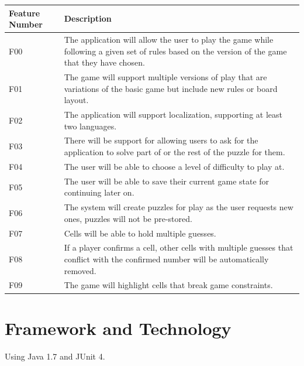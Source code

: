\documentclass{article}
\begin{document}
\begin{tabular}{ | p{1.5in} | p{4.5in} | }
\hline
\textbf{Feature Number} & \textbf{Description}\\
\hline
\hline
F00 & The application will allow the user to play the game while following a given set of rules based on the version of the game that they have chosen.\\
\hline
F01 & The game will support multiple versions of play that are variations of the basic game but include new rules or board layout.\\
\hline
F02 & The application will support localization, supporting at least two languages.\\
\hline
F03 & There will be support for allowing users to ask for the application to solve part of or the rest of the puzzle for them.\\
\hline
F04 & The user will be able to choose a level of difficulty to play at.\\
\hline
F05 & The user will be able to save their current game state for continuing later on.\\
\hline
F06 & The system will create puzzles for play as the user requests new ones, puzzles will not be pre-stored.\\
\hline
F07 & Cells will be able to hold multiple guesses.\\
\hline
F08 & If a player confirms a cell, other cells with multiple guesses that conflict with the confirmed number will be automatically removed.\\
\hline
F09 & The game will highlight cells that break game constraints.\\
\hline
\end{tabular}

\section{Framework and Technology}
Using Java 1.7 and JUnit 4.
\end{document}

